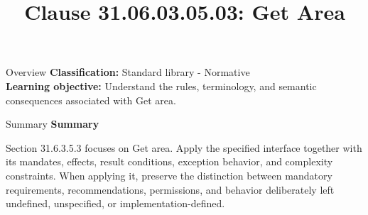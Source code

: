 \documentclass[10pt,letterpaper]{article}
\title{Clause 31.06.03.05.03: Get Area}
\author{}
\date{}
\begin{document}
\maketitle
\begin{CornellOverviewBox}{Overview}
\textbf{Classification:} Standard library - Normative\\[2pt]
\textbf{Learning objective:} Understand the rules, terminology, and semantic consequences associated with Get area.
\end{CornellOverviewBox}\begin{CornellSummaryBox}{Summary}
{\sffamily\bfseries\color{Accent} Summary}\par\vspace{3pt}Section 31.6.3.5.3 focuses on Get area. Apply the specified interface together with its mandates, effects, result conditions, exception behavior, and complexity constraints. When applying it, preserve the distinction between mandatory requirements, recommendations, permissions, and behavior deliberately left undefined, unspecified, or implementation-defined.
\end{CornellSummaryBox}
\end{document}

